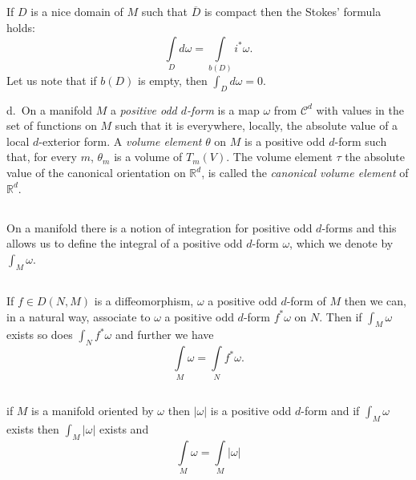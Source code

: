 \subsection{}\label{chap0:0.3.13}

If $D$ is a nice domain of $M$ such that $\overline{D}$ is compact
then the Stokes' formula holds:
$$
\int\limits_{D}d\omega=\int\limits_{b(D)}i^{\ast}\omega.
$$
Let us note that if $b(D)$ is empty, then $\int_{D}d\omega=0$.

d.~On a manifold $M$ a {\em positive odd $d$-form} is a map $\omega$
from $\mathscr{C}^{d}$ with values in the set of functions on $M$ such
that it is everywhere, locally, the absolute value of a local
$d$-exterior form. A {\em volume element} $\theta$ on $M$ is a
positive odd $d$-form such that, for every \pageoriginale $m$,
$\theta_{m}$ is a 
volume of $T_{m}(V)$. The volume element $\tau$ the absolute
value of the canonical orientation on $\mathbb{R}^{d}$, is called the
{\em canonical volume element} of $\mathbb{R}^{d}$.

\subsection{}\label{chap0:0.3.14}

On a manifold there is a notion of integration for positive odd
$d$-forms and this allows us to define the integral of a positive odd
$d$-form $\omega$, which we denote by $\int_{M}\omega$.

\subsection{}\label{chap0:0.3.15}

If $f\in D(N,M)$ is a diffeomorphism, $\omega$ a positive odd $d$-form
of $M$ then we can, in a natural way, associate to $\omega$ a positive
odd $d$-form $f^{\ast}\omega$ on $N$. Then if $\int_{M}\omega$ exists
so does $\int_{N}f^{\ast}\omega$ and further we have
$$
\int\limits_{M}\omega=\int\limits_{N}f^{\ast}\omega.
$$

\subsection{}\label{chap0:0.3.16}

\setcounter{remark}{15}
\begin{remark*}
if $M$ is a manifold oriented by $\omega$ then $|\omega|$ is a
positive odd $d$-form and if $\int_{M}\omega$ exists then
$\int_{M}|\omega|$ exists and 
$$
\int\limits_{M}\omega=\int\limits_{M}|\omega|
$$
\end{remark*}

